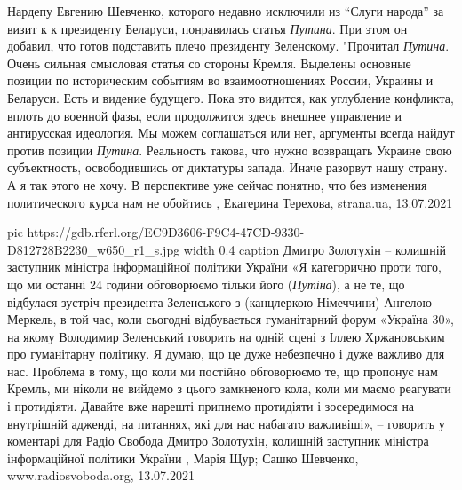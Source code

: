 Нардепу Евгению Шевченко, которого недавно исключили из \enquote{Слуги народа} за визит
к к президенту Беларуси,  понравилась статья \emph{Путина}. При этом он
добавил, что готов подставить плечо президенту Зеленскому.  "Прочитал
\emph{Путина}. Очень сильная смысловая статья со стороны Кремля. Выделены
основные позиции по историческим событиям во взаимоотношениях России, Украины и
Беларуси.  Есть и видение будущего. Пока это видится, как углубление конфликта,
вплоть до военной фазы, если продолжится здесь внешнее управление и антирусская
идеология.  Мы можем соглашаться или нет, аргументы всегда найдут против
позиции \emph{Путина}.  Реальность такова, что нужно возвращать Украине свою
субъектность, освободившись от диктатуры запада. Иначе разорвут нашу страну. А
я так этого не хочу.  В перспективе уже сейчас понятно, что без изменения
политического курса нам не обойтись
, 
Екатерина Терехова, strana.ua, 13.07.2021

\ifcmt
  pic https://gdb.rferl.org/EC9D3606-F9C4-47CD-9330-D812728B2230_w650_r1_s.jpg
  width 0.4
	caption Дмитро Золотухін – колишній заступник міністра інформаційної політики України
\fi
«Я категорично проти того, що ми останні 24 години обговорюємо тільки його
(\emph{Путіна}), а не те, що відбулася зустріч президента Зеленського з (канцлеркою
Німеччини) Ангелою Меркель, в той час, коли сьогодні відбувається гуманітарний
форум «Україна 30», на якому Володимир Зеленський говорить на одній сцені з
Іллею Хржановським про гуманітарну політику. Я думаю, що це дуже небезпечно і
дуже важливо для нас. Проблема в тому, що коли ми постійно обговорюємо те, що
пропонує нам Кремль, ми ніколи не вийдемо з цього замкненого кола, коли ми
маємо реагувати і протидіяти. Давайте вже нарешті припнемо протидіяти і
зосередимося на внутрішній адженді, на питаннях, які для нас набагато
важливіші», – говорить у коментарі для Радіо Свобода Дмитро Золотухін, колишній
заступник міністра інформаційної політики України
, 
Марія Щур; Сашко Шевченко, www.radiosvoboda.org, 13.07.2021


